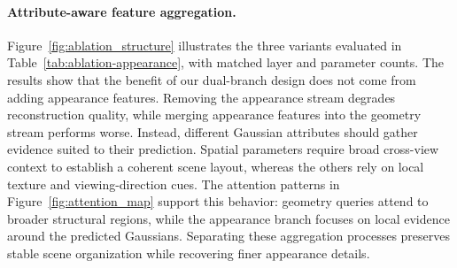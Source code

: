 \documentclass[letterpaper]{article} %
\begin{document}

\paragraph{Attribute-aware feature aggregation.}
Figure~\ref{fig:ablation_structure} illustrates the three variants evaluated in Table~\ref{tab:ablation-appearance}, with matched layer and parameter counts. The results show that the benefit of our dual-branch design does not come from adding appearance features. Removing the appearance stream degrades reconstruction quality, while merging appearance features into the geometry stream performs worse. Instead, different Gaussian attributes should gather evidence suited to their prediction. Spatial parameters require broad cross-view context to establish a coherent scene layout, whereas the others rely on local texture and viewing-direction cues. The attention patterns in Figure~\ref{fig:attention_map} support this behavior: geometry queries attend to broader structural regions, while the appearance branch focuses on local evidence around the predicted Gaussians. Separating these aggregation processes preserves stable scene organization while recovering finer appearance details.
\end{document}
